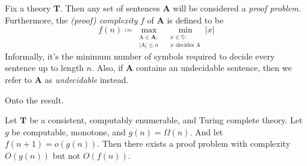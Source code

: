 \documentclass{article}
\theoremstyle{customstyle}
\newcommand{\T}{\mathbf{T}}
\begin{document}
\begin{definition}
Fix a theory $\T$. Then any set of sentences $\mathbf{A}$ will be considered a \emph{proof problem}. Furthermore, the \textit{(proof) complexity} $f$ of $\mathbf{A}$ is defined to be
\[
f(n) \coloneqq \max_{\substack{\mathrm{A} \in \mathbf{A} \colon\\ \lvert \mathrm{A} \rvert \leq n}} \; \min_{\substack{x \in \mathbb{S} \colon\\ x \text{ decides } \mathrm{A}}} \lvert x \rvert
\]
Informally, it's the minimum number of symbols required to decide every sentence up to length $n$. Also, if $\mathbf{A}$ contains an undecidable sentence, then we refer to $\mathbf{A}$ as \emph{undecidable} instead.
\end{definition}

Onto the result.

\begin{theorem}
Let $\T$ be a consistent, computably enumerable, and Turing complete theory. Let $g$ be computable, monotone, and $g(n) = \Omega(n)$. And let $f(n+1) = o(g(n))$. Then there exists a proof problem with complexity $O(g(n))$ but not $O(f(n))$.
\end{theorem}
\end{document}
